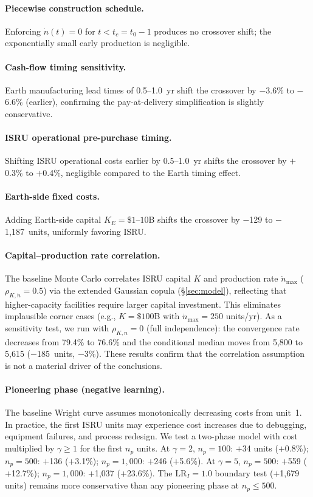 \documentclass[preprint,12pt]{elsarticle}
\begin{document}
\paragraph{Piecewise construction schedule.} Enforcing $\dot{n}(t) = 0$ for $t < t_c = t_0 - 1$ produces no crossover shift; the exponentially small early production is negligible.

\paragraph{Cash-flow timing sensitivity.} Earth manufacturing lead times of 0.5--1.0~yr shift the crossover by $-$3.6\% to $-$6.6\% (earlier), confirming the pay-at-delivery simplification is slightly conservative.

\paragraph{ISRU operational pre-purchase timing.} Shifting ISRU operational costs earlier by 0.5--1.0~yr shifts the crossover by $+$0.3\% to $+$0.4\%, negligible compared to the Earth timing effect.

\paragraph{Earth-side fixed costs.} Adding Earth-side capital $K_E = \$1$--$10$B shifts the crossover by $-$129 to $-$1{,}187~units, uniformly favoring ISRU.

\paragraph{Capital--production rate correlation.} The baseline Monte Carlo correlates ISRU capital $K$ and production rate $\dot{n}_{\max}$ ($\rho_{K,\dot{n}} = 0.5$) via the extended Gaussian copula (\S\ref{sec:model}), reflecting that higher-capacity facilities require larger capital investment. This eliminates implausible corner cases (e.g., $K = \$100$B with $\dot{n}_{\max} = 250$ units/yr). As a sensitivity test, we run with $\rho_{K,\dot{n}} = 0$ (full independence): the convergence rate decreases from 79.4\% to 76.6\% and the conditional median moves from 5{,}800 to 5{,}615 ($-$185~units, $-$3\%). These results confirm that the correlation assumption is not a material driver of the conclusions.

\paragraph{Pioneering phase (negative learning).} The baseline Wright curve assumes monotonically decreasing costs from unit~1. In practice, the first ISRU units may experience cost increases due to debugging, equipment failures, and process redesign. We test a two-phase model with cost multiplied by $\gamma \geq 1$ for the first $n_p$ units. At $\gamma = 2$, $n_p = 100$: $+$34 units ($+$0.8\%); $n_p = 500$: $+$136 ($+$3.1\%); $n_p = 1{,}000$: $+$246 ($+$5.6\%). At $\gamma = 5$, $n_p = 500$: $+$559 ($+$12.7\%); $n_p = 1{,}000$: $+$1{,}037 ($+$23.6\%). The $\mathrm{LR}_I = 1.0$ boundary test ($+$1{,}679 units) remains more conservative than any pioneering phase at $n_p \leq 500$.
\end{document}
